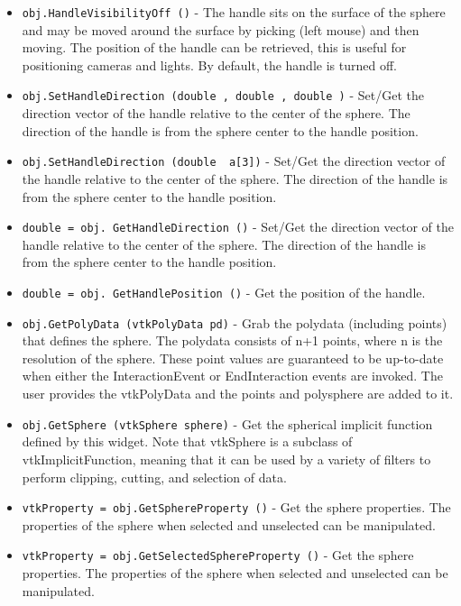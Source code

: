 \begin{itemize}
\item  \verb|obj.HandleVisibilityOff ()| -  The handle sits on the surface of the sphere and may be moved around
 the surface by picking (left mouse) and then moving. The position
 of the handle can be retrieved, this is useful for positioning cameras
 and lights. By default, the handle is turned off.

\item  \verb|obj.SetHandleDirection (double , double , double )| -  Set/Get the direction vector of the handle relative to the center of
 the sphere. The direction of the handle is from the sphere center to
 the handle position.

\item  \verb|obj.SetHandleDirection (double  a[3])| -  Set/Get the direction vector of the handle relative to the center of
 the sphere. The direction of the handle is from the sphere center to
 the handle position.

\item  \verb|double = obj. GetHandleDirection ()| -  Set/Get the direction vector of the handle relative to the center of
 the sphere. The direction of the handle is from the sphere center to
 the handle position.

\item  \verb|double = obj. GetHandlePosition ()| -  Get the position of the handle.

\item  \verb|obj.GetPolyData (vtkPolyData pd)| -  Grab the polydata (including points) that defines the sphere.  The
 polydata consists of n+1 points, where n is the resolution of the
 sphere. These point values are guaranteed to be up-to-date when either the
 InteractionEvent or EndInteraction events are invoked. The user provides
 the vtkPolyData and the points and polysphere are added to it.

\item  \verb|obj.GetSphere (vtkSphere sphere)| -  Get the spherical implicit function defined by this widget.  Note that
 vtkSphere is a subclass of vtkImplicitFunction, meaning that it can be
 used by a variety of filters to perform clipping, cutting, and selection
 of data.

\item  \verb|vtkProperty = obj.GetSphereProperty ()| -  Get the sphere properties. The properties of the sphere when selected 
 and unselected can be manipulated.

\item  \verb|vtkProperty = obj.GetSelectedSphereProperty ()| -  Get the sphere properties. The properties of the sphere when selected 
 and unselected can be manipulated.


\end{itemize}
